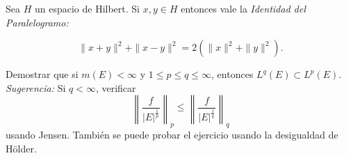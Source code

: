 \documentclass{book}
\newcommand{\rr}{\mathbb{R}}
\begin{document}
		
\begin{ejer}{} 
Sea $H$ un espacio de Hilbert. Si $x,y\in H$ entonces vale la {\it{Identidad del Paralelogramo:}}

 $$\|x+y\|^2+\|x-y\|^2=2(\|x\|^2+\|y\|^2). $$
 \end{ejer}
 


	
	
	
	\begin{ejer}{}
 Demostrar que si $m(E)<\infty$ y $1\leq p\leq q \leq \infty$, entonces 
$L^{q}(E)\subset L^{p}(E)$.
\\
{\it Sugerencia:} Si $q<\infty$, verificar 
$$\left\|\frac{f}{|E|^{\frac{1}{p}}}\right\|_p\leq
\left\|\frac{f}{|E|^{\frac{1}{q}}}\right\|_q$$
usando Jensen.
Tambi\'en se puede probar el ejercicio usando la desigualdad de H\"older.
\end{ejer}

\end{document}
